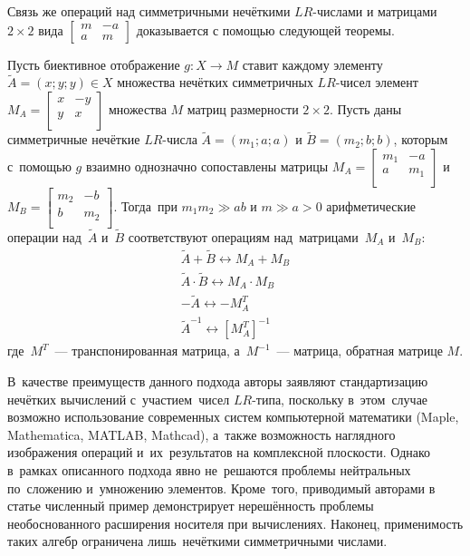 Связь же операций над симметричными нечёткими $LR$-числами и матрицами $2\times 2$ вида $\left[ \begin{matrix}
   m & -a  \\
   a & m 
\end{matrix} \right]$ доказывается с помощью следующей теоремы.
\begin{theorem}
Пусть биективное отображение $g:X\to M$ ставит каждому элементу $\tilde{A}=\left( x;y;y \right)\in X$ множества нечётких симметричных $LR$-чисел элемент ${{M}_{A}}=\left[ \begin{matrix}
   x & -y  \\
   y & x  \\
\end{matrix} \right]$ множества $M$ матриц размерности $2\times 2$. Пусть даны симметричные нечёткие $LR$-числа $\tilde{A}=\left( {{m}_{1}};a;a \right)$ и $\tilde{B}=\left( {{m}_{2}};b;b \right)$, которым с~помощью $g$ взаимно однозначно сопоставлены матрицы ${{M}_{A}}=\left[ \begin{matrix}
   {{m}_{1}} & -a  \\
   a & {{m}_{1}}  \\
\end{matrix} \right]$ и ${{M}_{B}}=\left[ \begin{matrix}
   {{m}_{2}} & -b  \\
   b & {{m}_{2}}  \\
\end{matrix} \right]$. Тогда~при ${{m}_{1}}{{m}_{2}}\gg ab$ и $m\gg a>0$ арифметические операции над~$\tilde A$ и~$\tilde B$ соответствуют операциям над~матрицами~${{M}_{A}}$ и~${{M}_{B}}$: 
\begin{gather*}
  \tilde{A}+\tilde{B}\leftrightarrow {{M}_{A}}+{{M}_{B}} \\ 
  \tilde{A}\cdot \tilde{B}\leftrightarrow {{M}_{A}}\cdot {{M}_{B}} \\ 
  -\tilde{A}\leftrightarrow -M_{A}^{T} \\ 
  {{{\tilde{A}}}^{-1}}\leftrightarrow {{\left[ M_{A}^{T} \right]}^{-1}}
\end{gather*}
где~${{M}^{T}}$~--- транспонированная матрица, а~${{M}^{-1}}$~--- матрица, обратная матрице $M$.
\end{theorem}

В~качестве преимуществ данного подхода авторы заявляют стандартизацию нечётких вычислений с~участием~чисел $LR$-типа, поскольку в~этом~случае возможно использование современных систем компьютерной математики (Maple, Mathematica, MATLAB, Mathcad), а~также возможность наглядного изображения операций и~их~результатов на комплексной плоскости. Однако в~рамках описанного подхода явно не~решаются проблемы нейтральных по~сложению и~умножению элементов. Кроме~того, приводимый авторами в статье численный пример демонстрирует нерешённость проблемы необоснованного расширения носителя при вычислениях. Наконец, применимость таких алгебр ограничена лишь~нечёткими симметричными числами.

